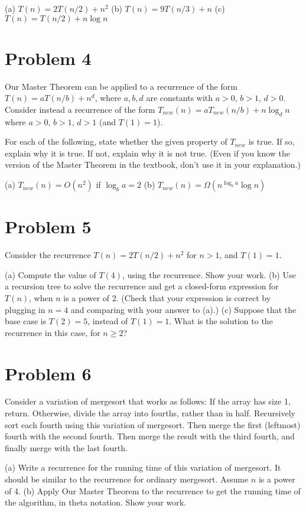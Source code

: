 \documentclass{article}
\begin{document}
(a) $T(n) = 2T(n/2) + n^2$
(b) $T(n) = 9T(n/3) + n$
(c) $T(n) = T(n/2) + n \log n$

\section*{Problem 4}
Our Master Theorem can be applied to a recurrence of the form $T(n) = aT(n/b) + n^d$, where $a, b, d$ are constants with $a > 0$, $b > 1$, $d > 0$. Consider instead a recurrence of the form $T_{new}(n) = aT_{new}(n/b) + n \log_d n$ where $a > 0$, $b > 1$, $d > 1$ (and $T(1) = 1$).

For each of the following, state whether the given property of $T_{new}$ is true. If so, explain why it is true. If not, explain why it is not true. (Even if you know the version of the Master Theorem in the textbook, don’t use it in your explanation.)

(a) $T_{new}(n) = O(n^2)$ if $\log_b a = 2$
(b) $T_{new}(n) = \Omega(n^{\log_b a} \log n)$


\section*{Problem 5}
Consider the recurrence $T(n) = 2T(n/2) + n^2$ for $n > 1$, and $T(1) = 1$.

(a) Compute the value of $T(4)$, using the recurrence. Show your work.
(b) Use a recursion tree to solve the recurrence and get a closed-form expression for $T(n)$, when $n$ is a power of 2. (Check that your expression is correct by plugging in $n = 4$ and comparing with your answer to (a).)
(c) Suppose that the base case is $T(2) = 5$, instead of $T(1) = 1$. What is the solution to the recurrence in this case, for $n \ge 2$?

\section*{Problem 6}
Consider a variation of mergesort that works as follows: If the array has size 1, return. Otherwise, divide the array into fourths, rather than in half. Recursively sort each fourth using this variation of mergesort. Then merge the first (leftmost) fourth with the second fourth. Then merge the result with the third fourth, and finally merge with the last fourth.

(a) Write a recurrence for the running time of this variation of mergesort. It should be similar to the recurrence for ordinary mergesort. Assume $n$ is a power of 4.
(b) Apply Our Master Theorem to the recurrence to get the running time of the algorithm, in theta notation. Show your work.
\end{document}
